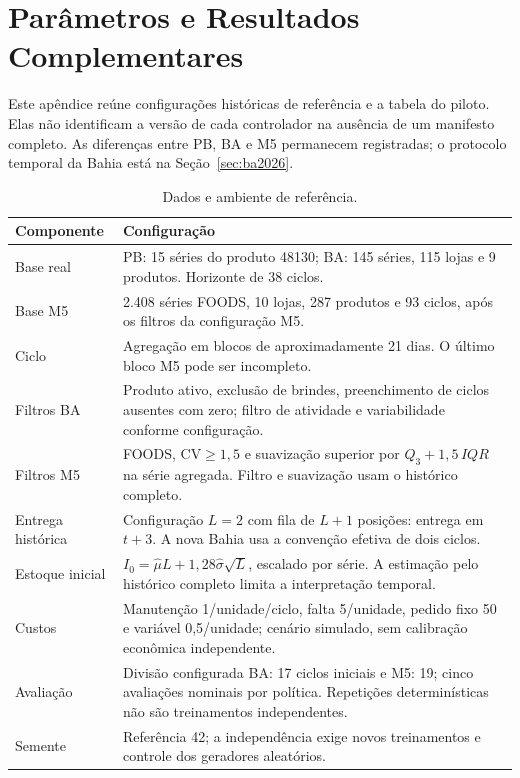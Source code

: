 \appendix
\chapter{Parâmetros e Resultados Complementares}
\label{app:reproducibility}
\renewcommand{\thetable}{A.\arabic{table}}
\setcounter{table}{0}

Este apêndice reúne configurações históricas de referência e a tabela do piloto. Elas não identificam a versão de cada controlador na ausência de um manifesto completo. As diferenças entre PB, BA e M5 permanecem registradas; o protocolo temporal da Bahia está na Seção~\ref{sec:ba2026}.

\begin{table}[htbp]\centering\small
\caption{Dados e ambiente de referência.}\label{tab:global_params}
\begin{tabular}{@{}p{3cm}p{11.4cm}@{}}\toprule
\textbf{Componente} & \textbf{Configuração}\\\midrule
Base real & PB: 15 séries do produto 48130; BA: 145 séries, 115 lojas e 9 produtos. Horizonte de 38 ciclos.\\
Base M5 & 2.408 séries FOODS, 10 lojas, 287 produtos e 93 ciclos, após os filtros da configuração M5.\\
Ciclo & Agregação em blocos de aproximadamente 21 dias. O último bloco M5 pode ser incompleto.\\
Filtros BA & Produto ativo, exclusão de brindes, preenchimento de ciclos ausentes com zero; filtro de atividade e variabilidade conforme configuração.\\
Filtros M5 & FOODS, CV$\geq1,5$ e suavização superior por $Q_3+1,5\,IQR$ na série agregada. Filtro e suavização usam o histórico completo.\\
Entrega histórica & Configuração $L=2$ com fila de $L+1$ posições: entrega em $t+3$. A nova Bahia usa a convenção efetiva de dois ciclos.\\
Estoque inicial & $I_0=\hat\mu L+1{,}28\hat\sigma\sqrt L$, escalado por série. A estimação pelo histórico completo limita a interpretação temporal.\\
Custos & Manutenção 1/unidade/ciclo, falta 5/unidade, pedido fixo 50 e variável 0,5/unidade; cenário simulado, sem calibração econômica independente.\\
Avaliação & Divisão configurada BA: 17 ciclos iniciais e M5: 19; cinco avaliações nominais por política. Repetições determinísticas não são treinamentos independentes.\\
Semente & Referência 42; a independência exige novos treinamentos e controle dos geradores aleatórios.\\
\bottomrule\end{tabular}\end{table}

